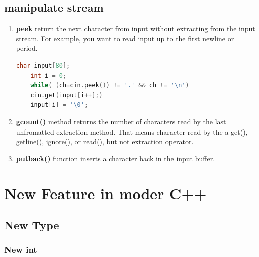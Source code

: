 \documentclass[a4paper,11pt,twoside]{book}
\begin{document}
\section{manipulate stream}
\begin{enumerate}
	\item \textbf{peek} return the next character from input without extracting from the input stream. For example, you want to read input up to the first newline or period.
	\begin{lstlisting}[frame=single, language=c++]
	char input[80];
	int i = 0;
	while( (ch=cin.peek()) != '.' && ch != '\n')
	cin.get(input[i++];)
	input[i] = '\0';
	\end{lstlisting}
	
	\item \textbf{gcount()} method returns the number of characters read by the last unfromatted extraction method. That means character read by the a get(), getline(), ignore(), or read(), but not extraction operator.
	
	\item \textbf{putback()} function inserts a character back in the input buffer.
\end{enumerate}




\chapter{New Feature in moder C++}

\section{New Type}

\subsection{New int}
\end{document}
